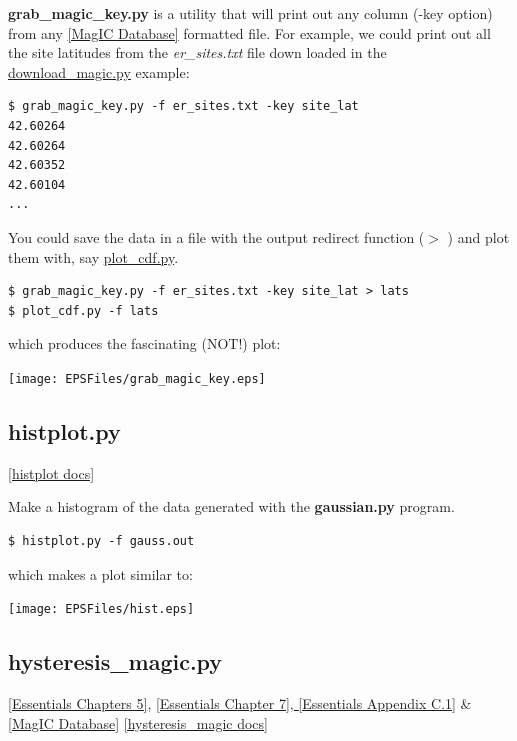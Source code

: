 \documentclass[11pt]{book}
\begin{document}
{{{{{\bf grab\_magic\_key.py} is  a utility that will print out any column (-key option) from any \href{#MagICDatabase}{[MagIC Database]} formatted file.  For example, we could print out all the site latitudes from the  {\it er\_sites.txt} file down loaded in the \href{#download_magic.py}{download\_magic.py} example:

\begin{verbatim}
$ grab_magic_key.py -f er_sites.txt -key site_lat
42.60264
42.60264
42.60352
42.60104
...
\end{verbatim}

You could save the data in a file with the output redirect function ($>$ ) and plot them with, say \href{#plot_cdf.py}{plot\_cdf.py}.

\begin{verbatim}
$ grab_magic_key.py -f er_sites.txt -key site_lat > lats
$ plot_cdf.py -f lats
\end{verbatim}

which produces  the fascinating (NOT!) plot:

\texttt{[image: EPSFiles/grab\_magic\_key.eps]}


\subsection{histplot.py}
\href{https://github.com/PmagPy/PmagPy/blob/master/programs/histplot.py}{[histplot docs]}

Make a histogram of the data generated with the {\bf gaussian.py} program.



\begin{verbatim}
$ histplot.py -f gauss.out
\end{verbatim}

\noindent  which makes a plot similar to:

  \texttt{[image: EPSFiles/hist.eps]}

\subsection{hysteresis\_magic.py}
\href{http://earthref.org/MAGIC/books/Tauxe/Essentials/WebBook3ch5.html#ch5}{[Essentials Chapters 5]}, \href{http://earthref.org/MAGIC/books/Tauxe/Essentials/WebBook3ch7.html#ch7}{[Essentials Chapter 7], }  \href{http://earthref.org/MAGIC/books/Tauxe/Essentials/WebBook3ap3.html#hysteresis_parameters}{[Essentials Appendix C.1]} \& \href{#MagICDatabase}{[MagIC Database]}
\href{https://github.com/PmagPy/PmagPy/blob/master/programs/hysteresis_magic.py}{[hysteresis\_magic docs]}

}}}}
\end{document}
